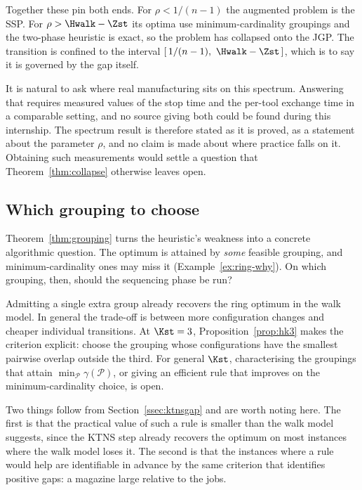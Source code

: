 Together these pin both ends. For $\rho<1/(n-1)$ the augmented problem is the SSP.
For $\rho>\Hwalk-\Zst$ its optima use minimum-cardinality groupings and the two-phase
heuristic is exact, so the problem has collapsed onto the JGP. The transition is
confined to the interval $[\,1/(n-1),\ \Hwalk-\Zst\,]$, which is to say it is governed
by the gap itself.

\begin{remark}\label{rem:rho}
It is natural to ask where real manufacturing sits on this spectrum. Answering that
requires measured values of the stop time and the per-tool exchange time in a
comparable setting, and no source giving both could be found during this internship.
The spectrum result is therefore stated as it is proved, as a statement about the
parameter $\rho$, and no claim is made about where practice falls on it. Obtaining
such measurements would settle a question that Theorem~\ref{thm:collapse} otherwise
leaves open.
\end{remark}

\subsection{Which grouping to choose}\label{ssec:grouping-sel}

Theorem~\ref{thm:grouping} turns the heuristic's weakness into a concrete algorithmic
question. The optimum is attained by \emph{some} feasible grouping, and
minimum-cardinality ones may miss it (Example~\ref{ex:ring-why}). On which grouping,
then, should the sequencing phase be run?

Admitting a single extra group already recovers the ring optimum in the walk model. In
general the trade-off is between more configuration changes and cheaper individual
transitions. At $\Kst=3$, Proposition~\ref{prop:hk3} makes the criterion explicit:
choose the grouping whose configurations have the smallest pairwise overlap outside
the third. For general $\Kst$, characterising the groupings that attain
$\min_{\mathcal{P}}\gamma(\mathcal{P})$, or giving an efficient rule that improves on
the minimum-cardinality choice, is open.

Two things follow from Section~\ref{ssec:ktnsgap} and are worth noting here. The
first is that the practical value of such a rule is smaller than the walk model
suggests, since the KTNS step already recovers the optimum on most instances where
the walk model loses it. The second is that the instances where a rule would help are
identifiable in advance by the same criterion that identifies positive gaps: a
magazine large relative to the jobs.
